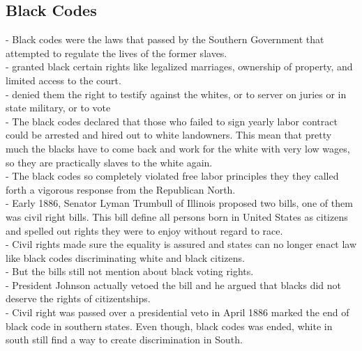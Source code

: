 \documentclass{article}
\begin{document}
\subsection{ Black Codes}
 - Black codes were the laws that passed by the Southern Government that attempted to regulate the lives of the former slaves. \\
 - granted black certain rights like legalized marriages, ownership of property, and limited access to the court.\\
 - denied them the right to testify against the whites, or to server on juries or in state military, or to vote\\
 - The black codes declared that those who failed to sign yearly labor contract could be arrested and hired out to white landowners. This mean that pretty much the blacks have to come back and work for the white with very low wages, so they are practically slaves to the white again.\\
 - The black codes so completely violated free labor principles they they called forth a vigorous response from the Republican North.\\
 - Early 1886, Senator Lyman Trumbull of Illinois proposed two bills, one of them was civil right bills. This bill define all persons born in United States as citizens and spelled out rights they were to enjoy without regard to race.\\
 - Civil rights made sure the equality is assured and states can no longer enact law like black codes discriminating white and black citizens.\\
 - But the bills still not mention about black voting rights. \\
 - President Johnson actually vetoed the bill and he argued that blacks did not deserve the rights of citizentships.\\
 - Civil right was passed over a presidential veto in April 1886 marked the end of black code in southern states. Even though, black codes was ended, white in south still find a way to create discrimination in South.\\
\end{document}
